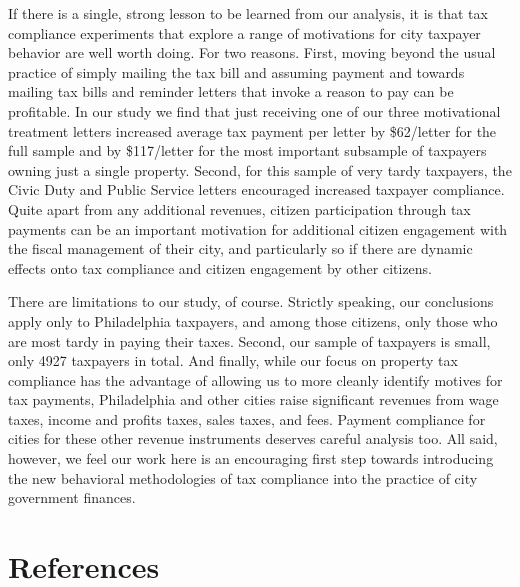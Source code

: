 \documentclass[12pt,titlepage]{article}
\begin{document}
If there is a single, strong lesson to be learned from our analysis,
it is that tax compliance experiments that explore a range of
motivations for city taxpayer behavior are well worth doing.  For two
reasons.  First, moving beyond the usual practice of simply mailing
the tax bill and assuming payment and towards mailing tax bills and
reminder letters that invoke a reason to pay can be profitable.  In
our study we find that just receiving one of our three motivational
treatment letters increased average tax payment per letter by
\$62/letter for the full sample and by \$117/letter for the most
important subsample of taxpayers owning just a single property.
Second, for this sample of very tardy taxpayers, the Civic Duty and
Public Service letters encouraged increased taxpayer compliance.
Quite apart from any additional revenues, citizen participation
through tax payments can be an important motivation for additional
citizen engagement with the fiscal management of their city, and
particularly so if there are dynamic effects onto tax compliance and
citizen engagement by other citizens.

There are limitations to our study, of course.  Strictly speaking, our
conclusions apply only to Philadelphia taxpayers, and among those
citizens, only those who are most tardy in paying their taxes. Second, our
sample of taxpayers is small, only 4927 taxpayers in total.  And
finally, while our focus on property tax compliance has the advantage
of allowing us to more cleanly identify motives for tax payments,
Philadelphia and other cities raise significant revenues from wage
taxes, income and profits taxes, sales taxes, and fees.  Payment
compliance for cities for these other revenue instruments deserves
careful analysis too.  All said, however, we feel our work here is an
encouraging first step towards introducing the new behavioral methodologies of
tax compliance into the practice of city government finances.

\newpage

\section*{References}
\end{document}
